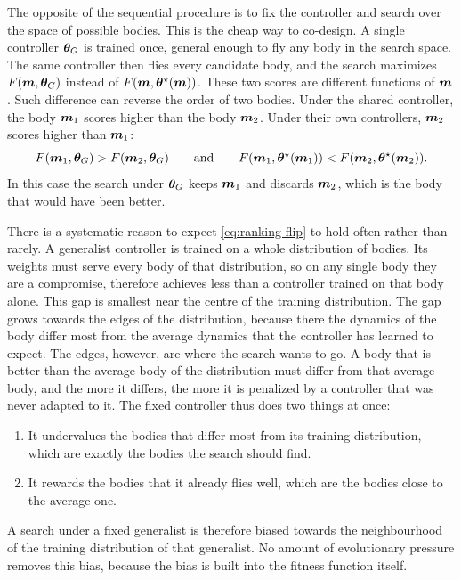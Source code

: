 The opposite of the sequential procedure is to fix the controller and search over the space of possible bodies. This is the cheap way to co-design. A single controller $\bm{\theta}_G$ is trained once, general enough to fly any body in the search space. The same controller then flies every candidate body, and the search maximizes $F(\bm{m}, \bm{\theta}_G)$ instead of $F(\bm{m}, \bm{\theta}^{\star}(\bm{m}))$. These two scores are different functions of $\bm{m}$. Such difference can reverse the order of two bodies. Under the shared controller, the body $\bm{m}_1$ scores higher than the body $\bm{m}_2$. Under their own controllers, $\bm{m}_2$ scores higher than $\bm{m}_1$:
\begin{equation}
F(\bm{m}_1, \bm{\theta}_G) > F(\bm{m}_2, \bm{\theta}_G) \qquad \text{and} \qquad F(\bm{m}_1, \bm{\theta}^{\star}(\bm{m}_1)) < F(\bm{m}_2, \bm{\theta}^{\star}(\bm{m}_2)).
\label{eq:ranking-flip}
\end{equation}
In this case the search under $\bm{\theta}_G$ keeps $\bm{m}_1$ and discards $\bm{m}_2$, which is the body that would have been better.

There is a systematic reason to expect \eqref{eq:ranking-flip} to hold often rather than rarely. A generalist controller is trained on a whole distribution of bodies. Its weights must serve every body of that distribution, so on any single body they are a compromise, therefore achieves less than a controller trained on that body alone. This gap is smallest near the centre of the training distribution. The gap grows towards the edges of the distribution, because there the dynamics of the body differ most from the average dynamics that the controller has learned to expect. The edges, however, are where the search wants to go. A body that is better than the average body of the distribution must differ from that average body, and the more it differs, the more it is penalized by a controller that was never adapted to it. The fixed controller thus does two things at once:
\begin{enumerate}
    \item It undervalues the bodies that differ most from its training distribution, which are exactly the bodies the search should find.
    \item It rewards the bodies that it already flies well, which are the bodies close to the average one.
\end{enumerate}
A search under a fixed generalist is therefore biased towards the neighbourhood of the training distribution of that generalist. No amount of evolutionary pressure removes this bias, because the bias is built into the fitness function itself.

